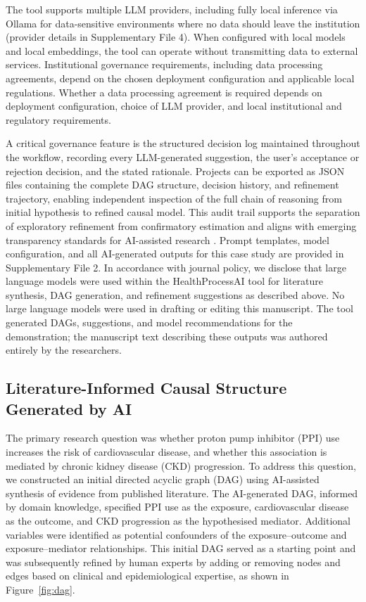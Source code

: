 \documentclass[sn-vancouver-num]{sn-jnl}
\begin{document}
The tool supports multiple LLM providers, including fully local inference via Ollama for data-sensitive environments where no data should leave the institution (provider details in Supplementary File 4). When configured with local models and local embeddings, the tool can operate without transmitting data to external services. Institutional governance requirements, including data processing agreements, depend on the chosen deployment configuration and applicable local regulations. Whether a data processing agreement is required depends on deployment configuration, choice of LLM provider, and local institutional and regulatory requirements. 

A critical governance feature is the structured decision log maintained throughout the workflow, recording every LLM-generated suggestion, the user’s acceptance or rejection decision, and the stated rationale. Projects can be exported as JSON files containing the complete DAG structure, decision history, and refinement trajectory, enabling independent inspection of the full chain of reasoning from initial hypothesis to refined causal model. This audit trail supports the separation of exploratory refinement from confirmatory estimation and aligns with emerging transparency standards for AI-assisted research \citep{williams2018}. Prompt templates, model configuration, and all AI-generated outputs for this case study are provided in Supplementary File 2. In accordance with journal policy, we disclose that large language models were used within the HealthProcessAI tool for literature synthesis, DAG generation, and refinement suggestions as described above. No large language models were used in drafting or editing this manuscript. The tool generated DAGs, suggestions, and model recommendations for the demonstration; the manuscript text describing these outputs was authored entirely by the researchers.

\subsection{Literature-Informed Causal Structure Generated by AI}
The primary research question was whether proton pump inhibitor (PPI) use increases the risk of cardiovascular disease, and whether this association is mediated by chronic kidney disease (CKD) progression. To address this question, we constructed an initial directed acyclic graph (DAG) using AI-assisted synthesis of evidence from published literature. The AI-generated DAG, informed by domain knowledge, specified PPI use as the exposure, cardiovascular disease as the outcome, and CKD progression as the hypothesised mediator. Additional variables were identified as potential confounders of the exposure--outcome and exposure--mediator relationships. This initial DAG served as a starting point and was subsequently refined by human experts by adding or removing nodes and edges based on clinical and epidemiological expertise, as shown in Figure~\ref{fig:dag}.
\end{document}
